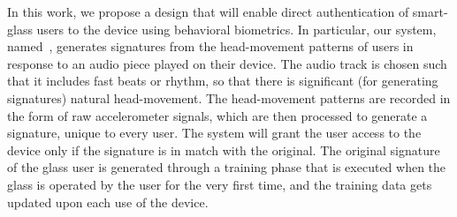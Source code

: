 In this work, we propose a design that will enable direct authentication 
of smart-glass users to the device using behavioral biometrics.
In particular, our system, named~\systemname, 
generates signatures from the head-movement patterns of users in response to 
an audio piece played on their device. The audio track is chosen such that
it includes fast beats or rhythm, so that there is significant 
(for generating signatures) natural head-movement.
The head-movement patterns are recorded in the form of 
raw accelerometer signals, which are then processed to generate 
a signature, unique to every user. The system will grant the user access to 
the device only if the signature is in match with the original.
The original signature of the glass user is generated through a 
training phase that is executed when the glass is operated 
by the user for the very first time, and the training data gets
updated upon each use of the device.